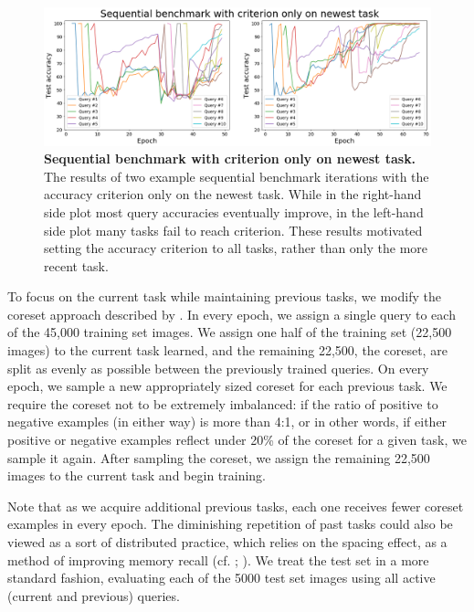 \begin{figure}[!htb]
\centering
\includegraphics[width=\linewidth]{ch-dataset-task-benchmark/figures/benchmark/old_benchmark.png}
\caption{{\bf Sequential benchmark with criterion only on newest task.} The results of two example sequential benchmark iterations with the accuracy criterion only on the newest task. While in the right-hand side plot most query accuracies eventually improve, in the left-hand side plot many tasks fail to reach criterion. These results motivated setting the accuracy criterion to all tasks, rather than only the more recent task.}
\label{fig:old-sequential-benchmark}
\end{figure}

To focus on the current task while maintaining previous tasks, we modify the coreset approach described by \textcite{Nguyen2018}. In every epoch, we assign a single query to each of the 45,000 training set images. We assign one half of the training set (22,500 images) to the current task learned, and the remaining 22,500, the coreset, are split as evenly as possible between the previously trained queries. On every epoch, we sample a new appropriately sized coreset for each previous task. We require the coreset not to be extremely imbalanced: if the ratio of positive to negative examples (in either way) is more than 4:1, or in other words, if either positive or negative examples reflect under 20\% of the coreset for a given task, we sample it again. After sampling the coreset, we assign the remaining 22,500 images to the current task and begin training. 

Note that as we acquire additional previous tasks, each one receives fewer coreset examples in every epoch. The diminishing repetition of past tasks could also be viewed as a sort of distributed practice, which relies on the spacing effect, as a method of improving memory recall (cf. \cite{Bahrick1993}; \cite{Russo1998}). We treat the test set in a more standard fashion, evaluating each of the 5000 test set images using all active (current and previous) queries.


